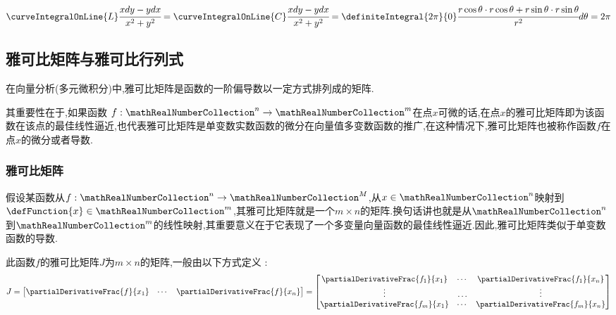 {{{\begin{enumerate}
{\begin{enumerate}
{\begin{enumerate}
{                              $$
                                \curveIntegralOnLine{L}\cfrac{xdy - ydx}{x^2 + y^2} = \curveIntegralOnLine{C}\cfrac{xdy - ydx}{x^2 + y^2} = \definiteIntegral{2\pi}{0}\cfrac{r\cos\theta \cdot r\cos\theta + r\sin\theta \cdot r\sin\theta}{r^2}d\theta = 2\pi
                              $$
                              }
                      \end{enumerate}
                      }
              \end{enumerate}
              }
      \end{enumerate}
    }%

  }%

  \subsection{雅可比矩阵与雅可比行列式}{
    在向量分析(多元微积分)中,雅可比矩阵是函数的一阶偏导数以一定方式排列成的矩阵.

    其重要性在于,如果函数 $f:\mathRealNumberCollection^n \to \mathRealNumberCollection^m$在点$x$可微的话,在点$x$的雅可比矩阵即为该函数在该点的最佳线性逼近,也代表雅可比矩阵是单变数实数函数的微分在向量值多变数函数的推广,在这种情况下,雅可比矩阵也被称作函数$f$在点$x$的微分或者导数.

    \subsubsection{雅可比矩阵}{
      假设某函数从$f : \mathRealNumberCollection^n \to \mathRealNumberCollection^M$,从$x\in\mathRealNumberCollection^n$映射到$\defFunction{x}\in\mathRealNumberCollection^m$,其雅可比矩阵就是一个$m \times n$的矩阵.换句话讲也就是从$\mathRealNumberCollection^n$到$\mathRealNumberCollection^m$的线性映射,其重要意义在于它表现了一个多变量向量函数的最佳线性逼近.因此,雅可比矩阵类似于单变数函数的导数.

      此函数$f$的雅可比矩阵$J$为$m \times n$的矩阵,一般由以下方式定义 :
      $$
        J =
        \begin{bmatrix}
          \partialDerivativeFrac{f}{x_1} & \dotsm & \partialDerivativeFrac{f}{x_n}
        \end{bmatrix}
        =
        \begin{bmatrix}
          \partialDerivativeFrac{f_1}{x_1} & \dotsm & \partialDerivativeFrac{f_1}{x_n} \\
          \vdots                           & \ldots & \vdots                           \\
          \partialDerivativeFrac{f_m}{x_1} & \dotsm & \partialDerivativeFrac{f_m}{x_n}
        \end{bmatrix}
      $$

}}}
